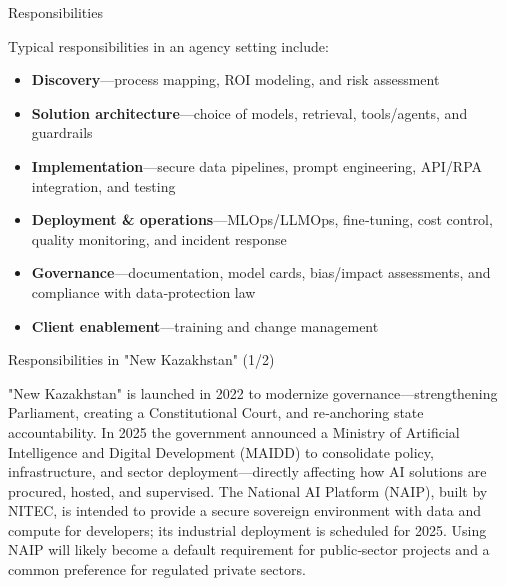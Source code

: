 \documentclass[aspectratio=169,14pt]{beamer}
\begin{document}
\begin{frame}{Responsibilities}
  \hspace{1.5cm}%
  \begin{minipage}{0.82\textwidth}
    \large
    Typical responsibilities in an agency setting include:

    \vspace{0.6cm}

    \begin{itemize}
      \setlength\itemsep{0.7em}
      \item \textbf{Discovery}—process mapping, ROI modeling, and risk assessment
      \item \textbf{Solution architecture}—choice of models, retrieval, tools/agents, and guardrails
      \item \textbf{Implementation}—secure data pipelines, prompt engineering, API/RPA integration, and testing
      \item \textbf{Deployment \& operations}—MLOps/LLMOps, fine‑tuning, cost control, quality monitoring, and incident response
      \item \textbf{Governance}—documentation, model cards, bias/impact assessments, and compliance with data‑protection law
      \item \textbf{Client enablement}—training and change management
    \end{itemize}
  \end{minipage}
\end{frame}

\begin{frame}{Responsibilities in "New Kazakhstan" (1/2)}
  \hspace{1.5cm}%
  \begin{minipage}{0.8\textwidth}
    "New Kazakhstan" is launched in 2022 to modernize governance—strengthening Parliament, creating a Constitutional Court, and re‑anchoring state accountability. In 2025 the government announced a Ministry of Artificial Intelligence and Digital Development (MAIDD) to consolidate policy, infrastructure, and sector deployment—directly affecting how AI solutions are procured, hosted, and supervised. The National AI Platform (NAIP), built by NITEC, is intended to provide a secure sovereign environment with data and compute for developers; its industrial deployment is scheduled for 2025. Using NAIP will likely become a default requirement for public‑sector projects and a common preference for regulated private sectors.
  \end{minipage}
\end{frame}
\end{document}
